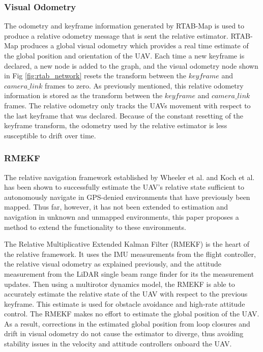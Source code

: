 \documentclass[letterpaper, 10 pt, conference]{ieeeconf}  %
\begin{document}
\subsubsection{Visual Odometry} \label{vis_odom}

The odometry and keyframe information generated by RTAB-Map is used to produce a relative odometry message that is sent the relative estimator. RTAB-Map produces a global visual odometry which provides a real time estimate of the global position and orientation of the UAV. Each time a new keyframe is declared, a new node is added to the graph, and the visual odometry node shown in Fig \ref{fig:rtab_network} resets the transform between the $\mathit{keyframe}$ and $\mathit{camera\_link}$ frames to zero. As previously mentioned, this relative odometry information is stored as the transform between the $\mathit{keyframe}$ and $\mathit{camera\_link}$ frames. The relative odometry only tracks the UAVs movement with respect to the last keyframe that was declared. Because of the constant resetting of the keyframe transform, the odometry used by the relative estimator is less susceptible to drift over time.

\subsubsection{RMEKF}

The relative navigation framework established by Wheeler et al. \cite{Wheeler2017}\cite{Wheeler2018} and Koch et al. \cite{Koch2017} has been shown to successfully estimate the UAV's relative state sufficient to autonomously navigate in GPS-denied environments that have previously been mapped. Thus far, however, it has not been extended to estimation and navigation in unknown and unmapped environments, this paper proposes a method to extend the functionality to these environments.

The Relative Multiplicative Extended Kalman Filter (RMEKF) is the heart of the relative framework. It uses the IMU measurements from the flight controller, the relative visual odometry as explained previously, and the attitude measurement from the LiDAR single beam range finder for its the measurement updates. Then using a multirotor dynamics model, the RMEKF is able to accurately estimate the relative state of the UAV with respect to the previous keyframe. This estimate is used for obstacle avoidance and high-rate attitude control. The RMEKF makes no effort to estimate the global position of the UAV. As a result, corrections in the estimated global position from loop closures and drift in visual odometry do not cause the estimator to diverge, thus avoiding stability issues in the velocity and attitude controllers onboard the UAV.
\end{document}
